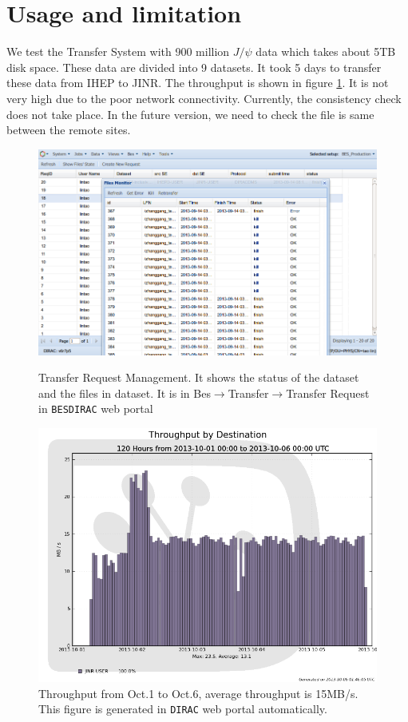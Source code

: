 \section{Usage and limitation}
We test the Transfer System with 900 million $J/\psi$ data 
which takes about 5TB disk space. 
These data are divided into 9 datasets.
It took 5 days to transfer 
these data from IHEP to JINR. The throughput is shown in 
figure \ref{fig:throughput}.
It is not very high due to the poor network connectivity.
Currently, the consistency check does not take place.
In the future version, we need to check the file is same between
the remote sites.
\begin{figure}[h]
\begin{minipage}{.49\textwidth}
\includegraphics[width=.95\textwidth, keepaspectratio]{data/transreqlist-with-kill-retransfer.png}
\caption{\label{fig:ui}Transfer Request Management.
It shows the status of the dataset and the files in dataset.
It is in Bes$\to$Transfer$\to$Transfer Request in {\tt BESDIRAC}
web portal}
\end{minipage}
\hspace{.02\textwidth}
\begin{minipage}{.49\textwidth}
\includegraphics[width=.95\textwidth, keepaspectratio]{data/throughput-dest-1001-10-06.png}
\caption{\label{fig:throughput}Throughput from Oct.1 to Oct.6, 
average throughput is 15MB/s. This figure is generated in 
{\tt DIRAC} web portal automatically.}
\end{minipage}
\end{figure}

